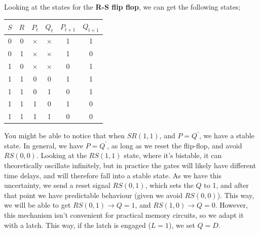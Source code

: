 \documentclass[a4paper, 12pt]{article}
\begin{document}
            Looking at the states for the \textbf{R-S flip flop}, we can get the following states;
            \begin{center}
                \begin{tabular}{c|c||c|c|c|c}
                    $S$ & $R$ & $P_t$ & $Q_t$ & $P_{t+1}$ & $Q_{t+1}$ \\
                    \hline
                    0 & 0 & $\times$ & $\times$ & 1 & 1 \\
                    0 & 1 & $\times$ & $\times$ & 1 & 0 \\
                    1 & 0 & $\times$ & $\times$ & 0 & 1 \\
                    1 & 1 & 0 & 0 & 1 & 1 \\
                    1 & 1 & 0 & 1 & 0 & 1 \\
                    1 & 1 & 1 & 0 & 1 & 0 \\
                    1 & 1 & 1 & 1 & 0 & 0
                \end{tabular}
            \end{center}
            You might be able to notice that when $SR(1, 1)$, and $P = Q^\prime$, we have a stable state. In general, we have $P = Q^\prime$, as long as we reset the flip-flop, and avoid $RS(0, 0)$. Looking at the $RS(1, 1)$ state, where it's bistable, it can theoretically oscillate infinitely, but in practice the gates will likely have different time delays, and will therefore fall into a stable state. As we have this uncertainty, we send a reset signal $RS(0, 1)$, which sets the $Q$ to 1, and after that point we have predictable behaviour (given we avoid $RS(0, 0)$). This way, we will be able to get $RS(0, 1) \to Q = 1$, and $RS(1, 0) \to Q = 0$. However, this mechanism isn't convenient for practical memory circuits, so we adapt it with a latch. This way, if the latch is engaged ($L = 1$), we set $Q = D$.
\end{document}
